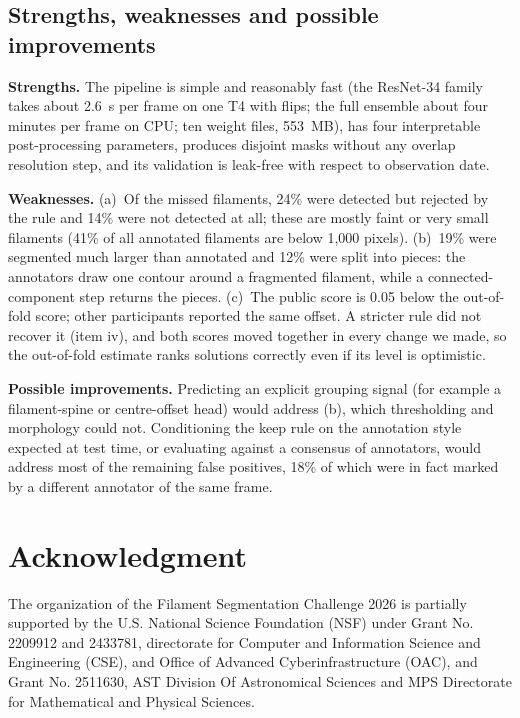 \documentclass[sigconf]{acmart}
\begin{document}
\subsection{Strengths, weaknesses and possible improvements}
    \textbf{Strengths.} The pipeline is simple and reasonably fast (the ResNet-34 family takes about 2.6~s per frame on one T4 with flips; the full ensemble about four minutes per frame on CPU; ten weight files, 553~MB), has four interpretable post-processing parameters, produces disjoint masks without any overlap resolution step, and its validation is leak-free with respect to observation date.

    \textbf{Weaknesses.} (a)~Of the missed filaments, 24\% were detected but rejected by the rule and 14\% were not detected at all; these are mostly faint or very small filaments (41\% of all annotated filaments are below 1{,}000 pixels). (b)~19\% were segmented much larger than annotated and 12\% were split into pieces: the annotators draw one contour around a fragmented filament, while a connected-component step returns the pieces. (c)~The public score is 0.05 below the out-of-fold score; other participants reported the same offset. A stricter rule did not recover it (item iv), and both scores moved together in every change we made, so the out-of-fold estimate ranks solutions correctly even if its level is optimistic.

    \textbf{Possible improvements.} Predicting an explicit grouping signal (for example a filament-spine or centre-offset head) would address (b), which thresholding and morphology could not. Conditioning the keep rule on the annotation style expected at test time, or evaluating against a consensus of annotators, would address most of the remaining false positives, 18\% of which were in fact marked by a different annotator of the same frame.

\section{Acknowledgment}\label{sec:acknowledgment}
    The organization of the Filament Segmentation Challenge 2026 is partially supported by the U.S. National Science Foundation (NSF) under Grant No. 2209912 and 2433781, directorate for Computer and Information Science and Engineering (CSE), and Office of Advanced Cyberinfrastructure (OAC), and Grant No. 2511630, AST Division Of Astronomical Sciences and MPS Directorate for Mathematical and Physical Sciences.
\end{document}

